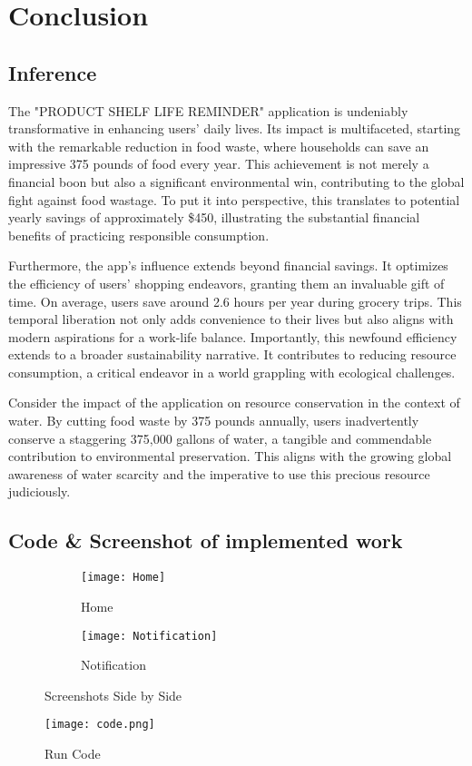 \chapter{Conclusion}
\section{Inference}

The "PRODUCT SHELF LIFE REMINDER" application is undeniably transformative in enhancing users' daily lives. Its impact is multifaceted, starting with the remarkable reduction in food waste, where households can save an impressive 375 pounds of food every year. This achievement is not merely a financial boon but also a significant environmental win, contributing to the global fight against food wastage. To put it into perspective, this translates to potential yearly savings of approximately \$450, illustrating the substantial financial benefits of practicing responsible consumption.

Furthermore, the app's influence extends beyond financial savings. It optimizes the efficiency of users' shopping endeavors, granting them an invaluable gift of time. On average, users save around 2.6 hours per year during grocery trips. This temporal liberation not only adds convenience to their lives but also aligns with modern aspirations for a work-life balance. Importantly, this newfound efficiency extends to a broader sustainability narrative. It contributes to reducing resource consumption, a critical endeavor in a world grappling with ecological challenges.

Consider the impact of the application on resource conservation in the context of water. By cutting food waste by 375 pounds annually, users inadvertently conserve a staggering 375,000 gallons of water, a tangible and commendable contribution to environmental preservation. This aligns with the growing global awareness of water scarcity and the imperative to use this precious resource judiciously. \\

\section{Code \& Screenshot of implemented work}

\begin{figure}
    \begin{subfigure}{0.5\textwidth}
        \centering
        \texttt{[image: Home]} %
        \caption{Home}
    \end{subfigure}%
    \begin{subfigure}{0.5\textwidth}
        \centering
        \texttt{[image: Notification]} %
        \caption{Notification}
    \end{subfigure}
    \caption{Screenshots Side by Side}
\end{figure}


\begin{figure}
    \centering
    \texttt{[image: code.png]} %
    \caption{Run Code}
\end{figure}
